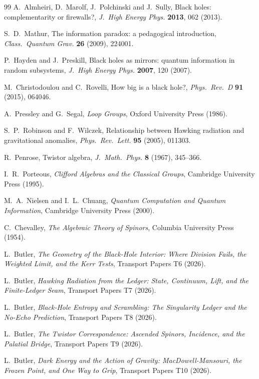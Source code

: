 \documentclass[11pt]{article}
\theoremstyle{definition}
\begin{document}
\begin{thebibliography}{99}
A.~Almheiri, D.~Marolf, J.~Polchinski and J.~Sully,
Black holes: complementarity or firewalls?,
\emph{J.\ High Energy Phys.} \textbf{2013}, 062 (2013).

S.~D.~Mathur,
The information paradox: a pedagogical introduction,
\emph{Class.\ Quantum Grav.} \textbf{26} (2009), 224001.

P.~Hayden and J.~Preskill,
Black holes as mirrors: quantum information in random subsystems,
\emph{J.\ High Energy Phys.} \textbf{2007}, 120 (2007).

M.~Christodoulou and C.~Rovelli,
How big is a black hole?,
\emph{Phys.\ Rev.\ D} \textbf{91} (2015), 064046.

A.~Pressley and G.~Segal,
\emph{Loop Groups},
Oxford University Press (1986).

S.~P.~Robinson and F.~Wilczek,
Relationship between Hawking radiation and gravitational anomalies,
\emph{Phys.\ Rev.\ Lett.} \textbf{95} (2005), 011303.

R.~Penrose,
Twistor algebra,
\emph{J.\ Math.\ Phys.} \textbf{8} (1967), 345--366.

I.~R.~Porteous,
\emph{Clifford Algebras and the Classical Groups},
Cambridge University Press (1995).

M.~A.~Nielsen and I.~L.~Chuang,
\emph{Quantum Computation and Quantum Information},
Cambridge University Press (2000).

C.~Chevalley,
\emph{The Algebraic Theory of Spinors},
Columbia University Press (1954).

L.~Butler,
\emph{The Geometry of the Black-Hole Interior: Where Division Fails, the Weighted Limit, and the Kerr Tests},
Transport Papers T6 (2026).

L.~Butler,
\emph{Hawking Radiation from the Ledger: State, Continuum, Lift, and the Finite-Ledger Seam},
Transport Papers T7 (2026).

L.~Butler,
\emph{Black-Hole Entropy and Scrambling: The Singularity Ledger and the No-Echo Prediction},
Transport Papers T8 (2026).

L.~Butler,
\emph{The Twistor Correspondence: Ascended Spinors, Incidence, and the Palatial Bridge},
Transport Papers T9 (2026).

L.~Butler,
\emph{Dark Energy and the Action of Gravity: MacDowell-Mansouri, the Frozen Point, and One Way to Grip},
Transport Papers T10 (2026).


\end{thebibliography}
\end{document}
